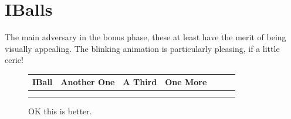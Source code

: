 \section{IBalls}
The main adversary in the bonus phase, these at least have the merit of being visually appealing. The blinking animation is
particularly pleasing, if a little eerie!
\begin{figure}[H]
  {
    \setlength{\tabcolsep}{1.0pt}
    \setlength\cmidrulewidth{\heavyrulewidth} %
    \begin{adjustbox}{width=14cm,center}
      \begin{tabular}{ccccccc}
        \toprule
        IBall & Another One & A Third & One More & \\
        \midrule
        \midrule
\makecell[l]{
	\begin{subfigure}{0.3\textwidth}
    \def\MULTICOLORONE{gray}
    \def\MULTICOLORTWO{white}
    \def\SPRITECOLOR{black}
		
	\end{subfigure}
} & 
\makecell[l]{
	\begin{subfigure}{0.3\textwidth}
    \def\MULTICOLORONE{gray}
    \def\MULTICOLORTWO{white}
    \def\SPRITECOLOR{black}
		
	\end{subfigure}
} & 
\makecell[l]{
	\begin{subfigure}{0.3\textwidth}
    \def\MULTICOLORONE{gray}
    \def\MULTICOLORTWO{white}
    \def\SPRITECOLOR{black}
		
	\end{subfigure}
} & 
\makecell[l]{
	\begin{subfigure}{0.3\textwidth}
    \def\MULTICOLORONE{gray}
    \def\MULTICOLORTWO{white}
    \def\SPRITECOLOR{black}
		
	\end{subfigure}
} \\ 
        \addlinespace
        \bottomrule
      \end{tabular}
    \end{adjustbox}
  }\caption{OK this is better.}
\end{figure}


